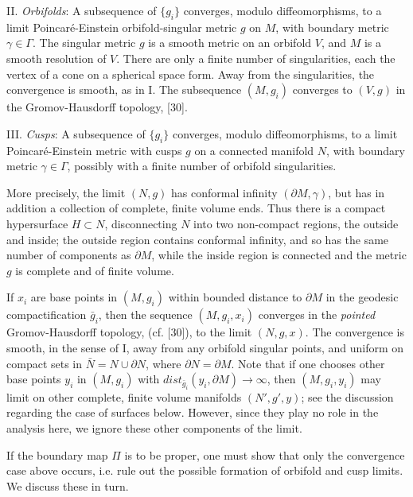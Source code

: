 \documentclass[11pt,amsfonts]{amsart}
\begin{document}
 II. {\em Orbifolds}: A subsequence of $\{g_{i}\}$ converges, modulo 
diffeomorphisms, to a limit Poincar\'e-Einstein orbifold-singular metric 
$g$ on $M$, with boundary metric $\gamma\in\Gamma$. The singular metric 
$g$ is a smooth metric on an orbifold $V$, and $M$ is a smooth resolution 
of $V$. There are only a finite number of singularities, each the vertex 
of a cone on a spherical space form. Away from the singularities, the 
convergence is smooth, as in I. The subsequence $(M, g_{i})$ converges to 
$(V, g)$ in the Gromov-Hausdorff topology, [30]. 

 III. {\em Cusps}: A subsequence of $\{g_{i}\}$ converges, modulo 
diffeomorphisms, to a limit Poincar\'e-Einstein metric with cusps $g$ 
on a connected manifold $N$, with boundary metric $\gamma\in\Gamma$, 
possibly with a finite number of orbifold singularities.

 More precisely, the limit $(N, g)$ has conformal infinity $(\partial M, 
\gamma)$, but has in addition a collection of complete, finite volume 
ends. Thus there is a compact hypersurface $H \subset N$, 
disconnecting $N$ into two non-compact regions, the outside and inside; 
the outside region contains conformal infinity, and so has the same number 
of components as $\partial M$, while the inside region is connected and the 
metric $g$ is complete and of finite volume. 

 If $x_{i}$ are base points in $(M, g_{i})$ within bounded distance to 
$\partial M$ in the geodesic compactification $\bar g_{i}$, then 
the sequence $(M, g_{i}, x_{i})$ converges in the {\it pointed} 
Gromov-Hausdorff topology, (cf. [30]), to the limit $(N, g, x)$. The 
convergence is smooth, in the sense of I, away from any orbifold singular 
points, and uniform on compact sets in $\bar N = N \cup \partial N$, where 
$\partial N = \partial M$. Note that if one chooses other base points $y_{i}$ 
in $(M, g_{i})$ with $dist_{\bar g_{i}}(y_{i}, \partial M) \rightarrow \infty$, 
then $(M, g_{i}, y_{i})$ may limit on other complete, finite volume 
manifolds $(N', g', y)$; see the discussion regarding the case of 
surfaces below. However, since they play no role in the analysis here, 
we ignore these other components of the limit. 

\medskip

 If the boundary map $\Pi$ is to be proper, one must show that only 
the convergence case above occurs, i.e. rule out the possible formation 
of orbifold and cusp limits. We discuss these in turn. 
\end{document}
